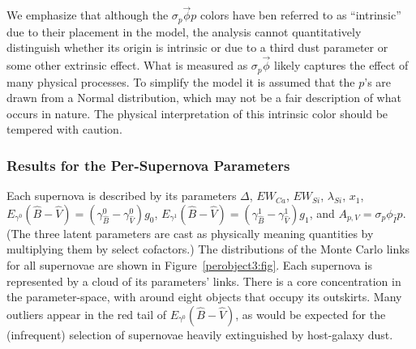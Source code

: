 \documentclass[trackchanges]{aastex61}   	%
\begin{document}
{We emphasize that
although the $\sigma_p \vec{\phi}p$ colors have ben referred to as ``intrinsic'' due to their placement in the model, the analysis cannot quantitatively distinguish
whether its origin is intrinsic or due to a third dust parameter or some other extrinsic effect.
What is measured as $\sigma_p \vec{\phi}$ likely captures the effect of many physical processes.
To simplify the model it is assumed that the $p$'s are drawn from a Normal distribution, which may not be a fair description of what occurs in nature.
The physical interpretation of this intrinsic color should be tempered with caution.


\subsubsection{Results for the Per-Supernova Parameters}
\label{results3per:sec}
Each supernova is described by its parameters $\Delta$, $EW_{Ca}$, $EW_{Si}$, $\lambda_{Si}$, $x_1$,
$E_{\gamma^0}({\hat{B}}-{\hat{V}})=(\gamma^0_{\hat{B}}-\gamma^0_{\hat{V}})g_0$, $E_{\gamma^1}({\hat{B}}-{\hat{V}})=(\gamma^1_{\hat{B}}-\gamma^1_{\hat{V}})g_1$, and $A_{p,V} =  \sigma_p\phi_{\hat{I}}p$.  (The  three latent parameters are cast as physically meaning
quantities by multiplying them by select cofactors.)
The distributions of the Monte Carlo links for all supernovae are shown in Figure~\ref{perobject3:fig}.
Each supernova is represented by a cloud of its parameters' links.
There is a core concentration in the  parameter-space, with around eight objects that occupy its outskirts.
Many outliers appear in the red tail of $E_{\gamma^0}({\hat{B}}-{\hat{V}})$, as would be expected for the (infrequent) selection of supernovae
heavily extinguished by host-galaxy dust.

}
\end{document}
